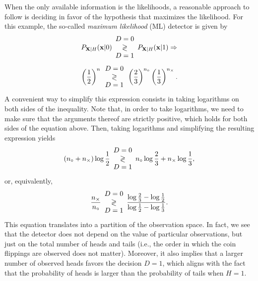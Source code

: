 \begin{solution}
\begin{itemize}
		When the only available information is the likelihoods, a reasonable approach to follow is deciding in favor of the hypothesis that maximizes the likelihood. For this example, the so-called {\em maximum likelihood} (ML) detector is given by
		$$P_{{\bf X}|H}({\bf x}|0)\begin{array}{c} D=0 \\ \gtrless \\ D=1 \end{array} P_{{\bf X}|H}({\bf x}|1) \Rightarrow$$
		$$\left( \frac{1}{2}\right)^{n} \begin{array}{c} D=0 \\ \gtrless \\ D=1 \end{array} \left( \frac{2}{3}\right)^{n_\circ} \left( \frac{1}{3}\right)^{n_\times}.$$
		A convenient way to simplify this expression consists in taking logarithms on both sides of the inequality. Note that, in order to take logarithms, we need to make sure that the arguments thereof are strictly positive, which holds for both sides of the equation above. Then, taking logarithms and simplifying the resulting expression yields
		$$(n_\circ + n_\times) \log\frac{1}{2} \begin{array}{c} D=0 \\ \gtrless \\ D=1 \end{array} n_\circ \log\frac{2}{3} + n_\times \log\frac{1}{3},$$
		or, equivalently,
		$$\frac{n_\times}{n_\circ} \begin{array}{c} D=0 \\ \gtrless \\ D=1 \end{array} \frac{\log\frac{2}{3} - \log\frac{1}{2}}{\log\frac{1}{2} - \log\frac{1}{3}}.$$
		This equation translates into a partition of the observation space. In fact, we see that the detector does not depend on the value of particular observations, but just on the total number of heads and tails (i.e., the order in which the coin flippings are observed does not matter). Moreover, it also implies that a larger number of observed heads favors the decision $D=1$, which aligns with the fact that the probability of heads is larger than the probability of tails when $H=1$.
		

\end{itemize}
\end{solution}
